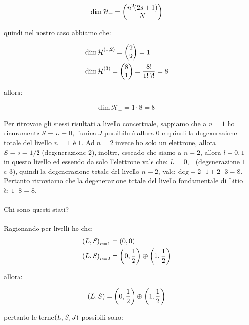 \begin{itemize}
	\begin{nb}
	\begin{align*}
		\text{dim} \, \mathcal{H}_- = \mqty(n^2\qty(2s + 1) \\ N )
	\end{align*}
	\end{nb}

		quindi nel nostro caso abbiamo che:
	
	\begin{align*}
		& \text{dim} \, \mathcal{H}_-^{\qty(1, 2)} = \mqty(2 \\ 2) = 1 \\
		& \text{dim} \, \mathcal{H}_-^{\qty(3)} = \mqty(8 \\ 1) = \frac{8!}{1! \, 7!} = 8
	\end{align*}
	
		allora:
	
	\begin{align*}
		\text{dim} \, \mathcal{H}_- = 1 \cdot 8 = 8
	\end{align*}

		Per ritrovare gli stessi risultati a livello concettuale, sappiamo che a $n = 1$ ho sicuramente $S = L = 0$, l'unica $ J $ possibile è allora $0$ e quindi la degenerazione totale del livello $n = 1$ è $1$. Ad $n = 2$ invece ho solo un elettrone, allora $S = s = 1/2$ (degenerazione $2$), inoltre, essendo che siamo a $n = 2$, allora $l = 0, 1$ in questo livello ed essendo da solo l'elettrone vale che: $L = 0, 1$ (degenerazione $1$ e $3$), quindi la degenerazione totale del livello $n = 2$, vale: $\text{deg} = 2 \cdot 1 + 2 \cdot 3  = 8$. Pertanto ritroviamo che la degenerazione totale del livello fondamentale di Litio è: $1 \cdot 8 = 8$.
		\\
		\\
		Chi sono questi stati?
		\\
		\\
		Ragionando per livelli ho che:
	\begin{align*}
		& \qty(L, S)_{n = 1} = \qty(0, 0) \\
		& \qty(L, S)_{n = 2} = \qty(0, \frac{1}{2}) \oplus \qty(1, \frac{1}{2}) 
	\end{align*}
	
		allora:
		
	\begin{align*}
		\qty(L, S) = \qty(0, \frac{1}{2}) \oplus \qty(1, \frac{1}{2}) 
	\end{align*}
	
		pertanto le terne$\qty(L, S, J)$ possibili sono:
		

\end{itemize}

